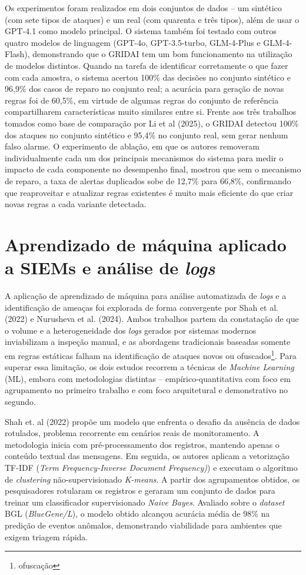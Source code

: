 Os experimentos foram realizados em dois conjuntos de dados -- um sintético (com sete tipos de ataques) e um real (com quarenta e três tipos), além de usar o GPT-4.1 como modelo principal. 
O sistema também foi testado com outros quatro modelos de linguagem (\gls{GPT}-4o, \gls{GPT}-3.5-turbo, \gls{GLM}-4-Plus e \gls{GLM}-4-Flash), demonstrando que o GRIDAI tem um bom funcionamento na utilização de modelos distintos.
Quando na tarefa de identificar corretamente o que fazer com cada amostra, o sistema acertou 100\% das decisões no conjunto sintético e 96,9\% dos casos de reparo no conjunto real; 
a acurácia para geração de novas regras foi de 60,5\%, em virtude de algumas regras do conjunto de referência compartilharem características muito similares entre si.
Frente aos três trabalhos tomados como base de comparação por Li et al (2025), o GRIDAI detectou 100\% dos ataques no conjunto sintético e 95,4\% no conjunto real, sem gerar nenhum falso alarme. 
O experimento de ablação, em que os autores removeram individualmente cada um dos principais mecanismos do sistema para medir o impacto de cada componente no desempenho final, mostrou que sem o mecanismo de reparo, a taxa de alertas duplicados sobe de 12,7\% para 66,8\%, 
confirmando que reaproveitar e atualizar regras existentes é muito mais eficiente do que criar novas regras a cada variante detectada.


\section{Aprendizado de máquina aplicado a SIEMs e análise de \textit{logs}}

A aplicação de aprendizado de máquina para análise automatizada de \textit{logs} e a identificação de ameaças foi explorada de forma convergente por Shah et al. (2022) e Nurusheva et al. (2024).
Ambos trabalhos partem da constatação de que o volume e a heterogeneidade dos \textit{logs} gerados por sistemas modernos inviabilizam a inspeção manual,
e as abordagens tradicionais baseadas somente em regras estáticas falham na identificação de ataques novos ou ofuscados\footnote{\gls{ofuscação}}.
Para superar essa limitação, os dois estudos recorrem a técnicas de \textit{Machine Learning} (ML), embora com metodologias distintas -- empírico-quantitativa com foco em agrupamento no primeiro trabalho e com foco arquitetural e demonstrativo no segundo.

Shah et. al (2022) propõe um modelo que enfrenta o desafio da ausência de dados rotulados, problema recorrente em cenários reais de monitoramento.
A metodologia inicia com pré-processamento dos registros, mantendo apenas o conteúdo textual das mensagens.
Em seguida, os autores aplicam a vetorização TF-IDF (\textit{Term Frequency-Inverse Document Frequency)}) e executam o algoritmo de \textit{clustering} não-supervisionado \textit{K-means}.
A partir dos agrupamentos obtidos, os pesquisadores rotularam os registros e geraram um conjunto de dados para treinar um classificador supervisionado \textit{Naive Bayes}.
Avaliado sobre o \textit{dataset} BGL (\textit{BlueGene/L}), o modelo obtido alcançou acurácia média de 98\% na predição de eventos anômalos, demonstrando viabilidade para ambientes que exigem triagem rápida.

